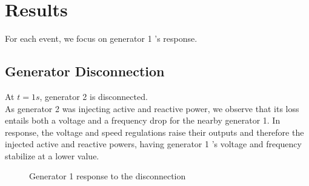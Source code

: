 \documentclass[a4paper, 12pt]{report}
\begin{document}
\newpage
\section{Results}

For each event, we focus on generator 1 's response.

\subsection{Generator Disconnection}
\label{DisconnectGenerator}

At $t=1s$, generator 2 is disconnected.\\

As generator 2 was injecting active and reactive power, we observe that its loss entails both a voltage and a frequency drop for the nearby generator 1. In response, the voltage and speed regulations raise their outputs and therefore the injected active and reactive powers, having generator 1 's voltage and frequency stabilize at a lower value.\\

\begin{figure}[H]
\caption{Generator 1 response to the disconnection}
\end{figure}
\end{document}
